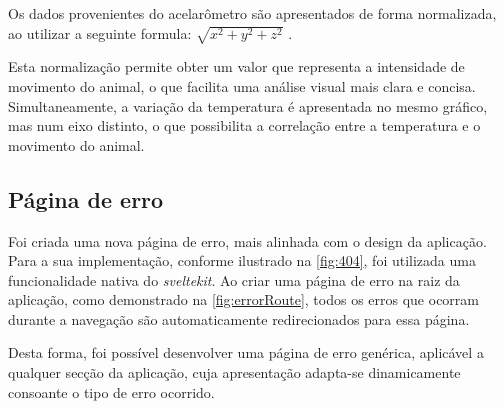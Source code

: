 Os dados provenientes do acelarômetro são apresentados de forma normalizada, ao utilizar a seguinte formula:
\begin{math}
	\sqrt{x^2 + y^2 + z^2}
\end{math}
.

Esta normalização permite obter um valor que representa a intensidade de movimento do animal, o que facilita uma análise visual mais clara e concisa. Simultaneamente, a variação da temperatura é apresentada no mesmo gráfico, mas num eixo distinto, o que possibilita a correlação entre a temperatura e o movimento do animal.

\subsection{Página de erro} %
Foi criada uma nova página de erro, mais alinhada com o design da aplicação. Para a sua implementação, conforme ilustrado na \autoref{fig:404}, foi utilizada uma funcionalidade nativa do \textit{sveltekit}. Ao criar uma página de erro na raiz da aplicação, como demonstrado na \autoref{fig:errorRoute}, todos os erros que ocorram durante a navegação são automaticamente redirecionados para essa página.

Desta forma, foi possível desenvolver uma página de erro genérica, aplicável a qualquer secção da aplicação, cuja apresentação adapta-se dinamicamente consoante o tipo de erro ocorrido.

